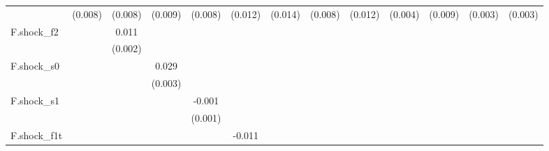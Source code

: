 {\begin{tabular}{l*{12}{c}}
            &     (0.008)         &     (0.008)         &     (0.009)         &     (0.008)         &     (0.012)         &     (0.014)         &     (0.008)         &     (0.012)         &     (0.004)         &     (0.009)         &     (0.003)         &     (0.003)         \\
\addlinespace
F.shock\_f2  &                     &       0.011\sym{***}&                     &                     &                     &                     &                     &                     &                     &                     &                     &                     \\
            &                     &     (0.002)         &                     &                     &                     &                     &                     &                     &                     &                     &                     &                     \\
\addlinespace
F.shock\_s0  &                     &                     &       0.029\sym{***}&                     &                     &                     &                     &                     &                     &                     &                     &                     \\
            &                     &                     &     (0.003)         &                     &                     &                     &                     &                     &                     &                     &                     &                     \\
\addlinespace
F.shock\_s1  &                     &                     &                     &      -0.001         &                     &                     &                     &                     &                     &                     &                     &                     \\
            &                     &                     &                     &     (0.001)         &                     &                     &                     &                     &                     &                     &                     &                     \\
\addlinespace
F.shock\_f1t &                     &                     &                     &                     &      -0.011\sym{**} &                     &                     &                     &                     &                     &                     &                     \\

\end{tabular}}
